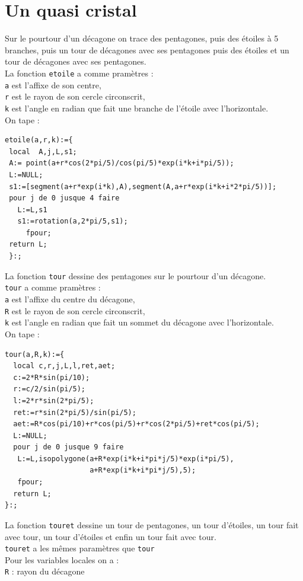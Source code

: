 \documentclass[a4paper,11pt]{book}
\begin{document}
\section{Un quasi cristal}
Sur le pourtour d'un d\'ecagone on trace des pentagones, puis des \'etoiles 
\`a 5 branches, puis un tour de d\'ecagones avec ses pentagones puis des 
\'etoiles et un tour de d\'ecagones avec ses pentagones.\\
La fonction {\tt etoile} a comme pram\`etres :\\
{\tt a} est l'affixe de son centre,\\
{\tt r} est le rayon de son cercle circonscrit,\\
{\tt k} est l'angle en radian que fait une branche de l'\'etoile avec l'horizontale.\\
On tape : 
\begin{verbatim}
etoile(a,r,k):={
 local  A,j,L,s1; 
 A:= point(a+r*cos(2*pi/5)/cos(pi/5)*exp(i*k+i*pi/5));
 L:=NULL;
 s1:=[segment(a+r*exp(i*k),A),segment(A,a+r*exp(i*k+i*2*pi/5))];
 pour j de 0 jusque 4 faire
   L:=L,s1
   s1:=rotation(a,2*pi/5,s1);  
     fpour;
 return L;
 }:;
\end{verbatim}
La fonction {\tt tour} dessine des pentagones sur le pourtour d'un d\'ecagone.\\
{\tt tour} a comme pram\`etres :\\
{\tt a} est l'affixe du centre du d\'ecagone,\\
{\tt R} est le rayon de son cercle circonscrit,\\
{\tt k} est l'angle en radian que fait un sommet du d\'ecagone avec l'horizontale.\\
On tape : 
\begin{verbatim}
tour(a,R,k):={
  local c,r,j,L,l,ret,aet;
  c:=2*R*sin(pi/10);
  r:=c/2/sin(pi/5);
  l:=2*r*sin(2*pi/5);
  ret:=r*sin(2*pi/5)/sin(pi/5);
  aet:=R*cos(pi/10)+r*cos(pi/5)+r*cos(2*pi/5)+ret*cos(pi/5);
  L:=NULL;
  pour j de 0 jusque 9 faire
   L:=L,isopolygone(a+R*exp(i*k+i*pi*j/5)*exp(i*pi/5),
                    a+R*exp(i*k+i*pi*j/5),5);
   fpour;
  return L;
}:;
\end{verbatim}
La fonction {\tt touret} dessine un tour de pentagones, un tour d'\'etoiles,
un tour fait avec tour, un tour d'\'etoiles et enfin un tour fait avec tour.\\
{\tt touret} a les m\^emes param\`etres que {\tt tour}\\
Pour les variables locales on a :\\
{\tt R} : rayon du d\'ecagone\\
\end{document}
